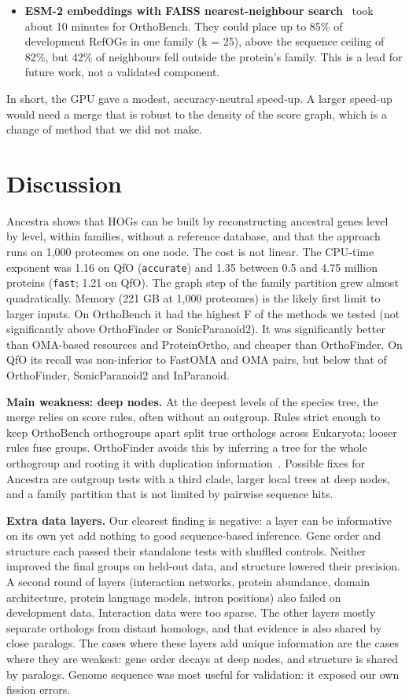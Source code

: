 \documentclass[10pt,letterpaper]{article}
\begin{document}
\begin{itemize}
\item \textbf{ESM-2 embeddings with FAISS nearest-neighbour search}~\cite{lin2023esm2,douze2026faiss} took about 10 minutes for OrthoBench. They could place up to 85\% of development RefOGs in one family (k = 25), above the sequence ceiling of 82\%, but 42\% of neighbours fell outside the protein's family. This is a lead for future work, not a validated component.
\end{itemize}
In short, the GPU gave a modest, accuracy-neutral speed-up. A larger speed-up would need a merge that is robust to the density of the score graph, which is a change of method that we did not make.

\section*{Discussion}
Ancestra shows that HOGs can be built by reconstructing ancestral genes level by level, within families, without a reference database, and that the approach runs on 1,000 proteomes on one node. The cost is not linear. The CPU-time exponent was 1.16 on QfO (\texttt{accurate}) and 1.35 between 0.5 and 4.75 million proteins (\texttt{fast}; 1.21 on QfO). The graph step of the family partition grew almost quadratically. Memory (221 GB at 1,000 proteomes) is the likely first limit to larger inputs. On OrthoBench it had the highest F of the methods we tested (not significantly above OrthoFinder or SonicParanoid2). It was significantly better than OMA-based resources and ProteinOrtho, and cheaper than OrthoFinder. On QfO its recall was non-inferior to FastOMA and OMA pairs, but below that of OrthoFinder, SonicParanoid2 and InParanoid.

\textbf{Main weakness: deep nodes.} At the deepest levels of the species tree, the merge relies on score rules, often without an outgroup. Rules strict enough to keep OrthoBench orthogroups apart split true orthologs across Eukaryota; looser rules fuse groups. OrthoFinder avoids this by inferring a tree for the whole orthogroup and rooting it with duplication information~\cite{emms2017stride,emms2019orthofinder}. Possible fixes for Ancestra are outgroup tests with a third clade, larger local trees at deep nodes, and a family partition that is not limited by pairwise sequence hits.

\textbf{Extra data layers.} Our clearest finding is negative: a layer can be informative on its own yet add nothing to good sequence-based inference. Gene order and structure each passed their standalone tests with shuffled controls. Neither improved the final groups on held-out data, and structure lowered their precision. A second round of layers (interaction networks, protein abundance, domain architecture, protein language models, intron positions) also failed on development data. Interaction data were too sparse. The other layers mostly separate orthologs from distant homologs, and that evidence is also shared by close paralogs. The cases where these layers add unique information are the cases where they are weakest: gene order decays at deep nodes, and structure is shared by paralogs. Genome sequence was most useful for validation: it exposed our own fission errors.
\end{document}
